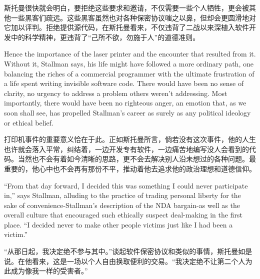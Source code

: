 \ifdefined\chs
斯托曼很快就会明白，要拒绝这些要求和邀请，不仅需要一些个人牺牲，更会被其他一些黑客们疏远。这些黑客虽然也对各种保密协议嗤之以鼻，但却会更圆滑地对它加以评判。拒绝提供源代码，在斯托曼看来，不仅违背了二战以来深植入软件开发中的科学精神，更违背了``己所不欲，勿施于人''的道德准则。
\fi

\ifdefined\eng
Hence the importance of the laser printer and the encounter that resulted from it. Without it, Stallman says, his life might have followed a more ordinary path, one balancing the riches of a commercial programmer with the ultimate frustration of a life spent writing invisible software code. There would have been no sense of clarity, no urgency to address a problem others weren't addressing. Most importantly, there would have been no righteous anger, an emotion that, as we soon shall see, has propelled Stallman's career as surely as any political ideology or ethical belief.
\fi

\ifdefined\chs
打印机事件的重要意义恰在于此。正如斯托曼所言，倘若没有这次事件，他的人生也许就会落入平常，纠结着，一边开发专有软件，一边痛苦地编写没人会看到的代码。当然也不会有着如今清晰的思路，更不会去解决别人沿未想过的各种问题。最重要的，他心中也不会再有那份不平，推动着他去追求他的政治理想和道德信仰。
\fi

\ifdefined\eng
``From that day forward, I decided this was something I could never participate in,'' says Stallman, alluding to the practice of trading personal liberty for the sake of convenience-Stallman's description of the NDA bargain-as well as the overall culture that encouraged such ethically suspect deal-making in the first place. ``I decided never to make other people victims just like I had been a victim.''
\fi

\ifdefined\chs
``从那日起，我决定绝不参与其中。''谈起软件保密协议和类似的事情，斯托曼如是说。在他看来，这是一场以个人自由换取便利的交易。``我决定绝不让第二个人为此成为像我一样的受害者。''
\fi

\theendnotes
\setcounter{endnote}{0}
